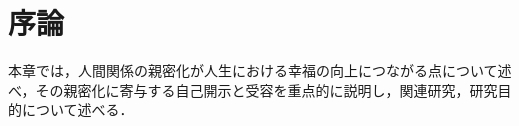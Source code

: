 \chapter{序論}
本章では，人間関係の親密化が人生における幸福の向上につながる点について述べ，その親密化に寄与する自己開示と受容を重点的に説明し，関連研究，研究目的について述べる．







